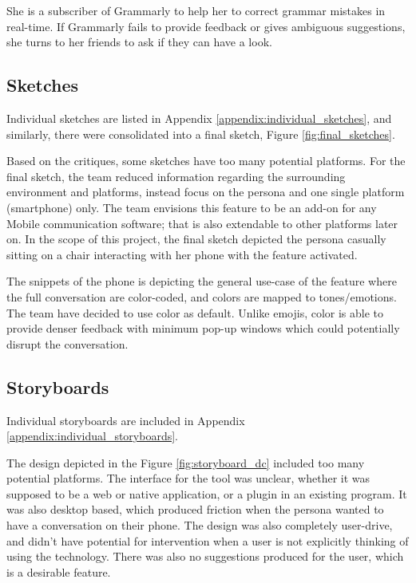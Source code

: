 \documentclass[acmsmall,screen,authorversion,nonacm]{acmart}
\begin{document}
She is a subscriber of Grammarly to help her to correct grammar mistakes in real-time. If
Grammarly fails to provide feedback or gives ambiguous suggestions, she turns to her friends to ask if they can have a look. 

\subsection{Sketches}

Individual sketches are listed in Appendix \ref{appendix:individual_sketches}, and similarly, there were consolidated into a final sketch, Figure \ref{fig:final_sketches}. 

Based on the critiques, some sketches have too many potential platforms. For the final sketch, the team reduced information regarding the surrounding environment and platforms, instead focus on the persona and one single platform (smartphone) only. The team envisions this feature to be an add-on for any Mobile communication software; that is also extendable to other platforms later on. In the scope of this project, the final sketch depicted the persona casually sitting on a chair interacting with her phone with the feature activated. 

The snippets of the phone is depicting the general use-case of the feature where the full conversation are color-coded, and colors are mapped to tones/emotions. The team have decided to use color as default. Unlike emojis, color is able to provide denser feedback with minimum pop-up windows which could potentially disrupt the conversation. 

\subsection{Storyboards}
Individual storyboards are included in Appendix \ref{appendix:individual_storyboards}.

The design depicted in the Figure \ref{fig:storyboard_dc} included too many potential platforms. The interface for the tool was unclear, whether it was supposed to be a web or native application, or a plugin in an existing program. It was also desktop based, which produced friction when the persona wanted to have a conversation on their phone. The design was also completely user-drive, and didn't have potential for intervention when a user is not explicitly thinking of using the technology. There was also no suggestions produced for the user, which is a desirable feature.
\end{document}
